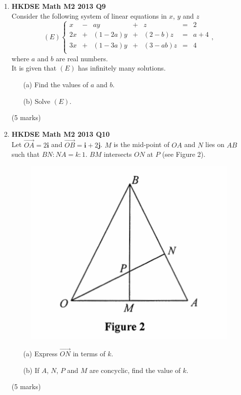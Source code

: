 \documentclass{report}
\begin{document}
\begin{enumerate}
	\item \textbf{HKDSE Math M2 2013 Q9}\\
	Consider the following system of linear equations in $x$, $y$ and $z$
		$$(E)  \left\{\begin{matrix}
		x & - & ay & + & z & = & 2\\
		2x & + & (1-2a)y & + & (2-b)z  & =  & a+4\\
		3x & + & (1-3a)y & + & (3-ab)z & = & 4\\
		\end{matrix}\right.,$$where $a$ and $b$ are real numbers. \\
		It is given that $(E)$ has infinitely many solutions.
	\begin{enumerate}
		\item [(a)]Find the values of $a$ and $b$.
		\item [(b)]Solve $(E)$.
	\end{enumerate}
	(5 marks)

	\item \textbf{HKDSE Math M2 2013 Q10}\\
	Let $\overrightarrow{OA} = 2\textbf{i}$ and 
	$\overrightarrow{OB} = \textbf{i} +2 \textbf{j}$. $M$ is the mid-point of $OA$ and $N$ lies on $AB$ such that $BN : NA = k: 1$. $BM$ intersects $ON$ at $P$ (see Figure 2).
	\begin{figure}[H]
		\centering
		\includegraphics[width = .5\linewidth]{2013Figure2}
	\end{figure}
	\begin{enumerate}
		\item [(a)]Express $\overrightarrow{ON}$ in terms of $k$.
		\item [(b)]If $A$, $N$, $P$ and $M$ are concyclic, find the value of $k$.
	\end{enumerate}
	(5 marks)


\end{enumerate}
\end{document}
